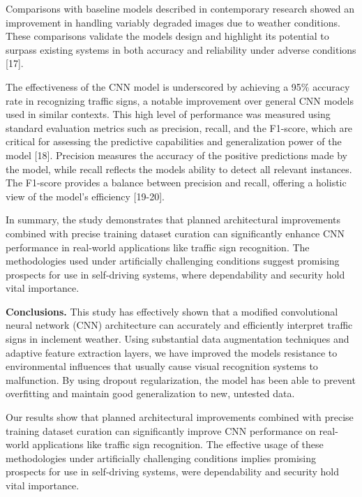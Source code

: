 Comparisons with baseline models described in contemporary research
showed an improvement in handling variably degraded images due to
weather conditions. These comparisons validate the
model\textquotesingle s design and highlight its potential to surpass
existing systems in both accuracy and reliability under adverse
conditions {[}17{]}.

The effectiveness of the CNN model is underscored by achieving a 95\%
accuracy rate in recognizing traffic signs, a notable improvement over
general CNN models used in similar contexts. This high level of
performance was measured using standard evaluation metrics such as
precision, recall, and the F1-score, which are critical for assessing
the predictive capabilities and generalization power of the model
{[}18{]}. Precision measures the accuracy of the positive predictions
made by the model, while recall reflects the model\textquotesingle s
ability to detect all relevant instances. The F1-score provides a
balance between precision and recall, offering a holistic view of the
model's efficiency {[}19-20{]}.

In summary, the study demonstrates that planned architectural
improvements combined with precise training dataset curation can
significantly enhance CNN performance in real-world applications like
traffic sign recognition. The methodologies used under artificially
challenging conditions suggest promising prospects for use in
self-driving systems, where dependability and security hold vital
importance.

\textbf{Conclusions.} This study has effectively shown that a modified
convolutional neural network (CNN) architecture can accurately and
efficiently interpret traffic signs in inclement weather. Using
substantial data augmentation techniques and adaptive feature extraction
layers, we have improved the model\textquotesingle s resistance to
environmental influences that usually cause visual recognition systems
to malfunction. By using dropout regularization, the model has been able
to prevent overfitting and maintain good generalization to new, untested
data.

Our results show that planned architectural improvements combined with
precise training dataset curation can significantly improve CNN
performance on real-world applications like traffic sign recognition.
The effective usage of these methodologies under artificially
challenging conditions implies promising prospects for use in
self-driving systems, were dependability and security hold vital
importance.

